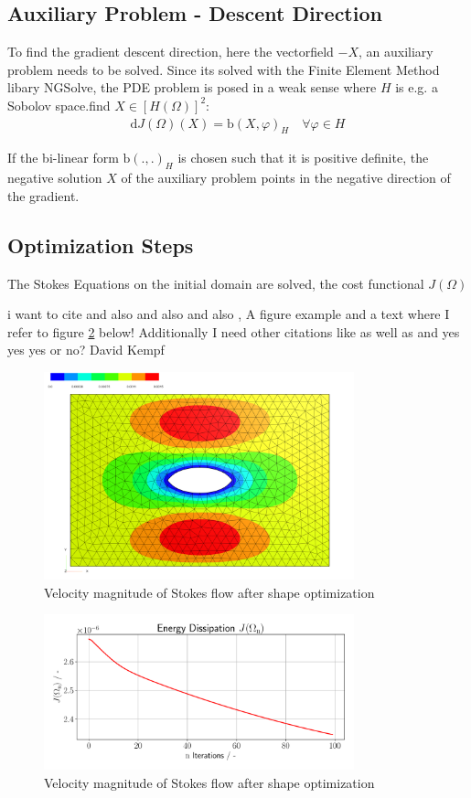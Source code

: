 \subsection*{Auxiliary Problem - Descent Direction}
To find the gradient descent direction, here the vectorfield $-X$, an auxiliary problem needs to be solved.
Since its solved with the Finite Element Method libary NGSolve, the PDE problem is posed in a weak sense where 
$H$ is e.g. a Sobolov space.find $X \in [H(\Omega)]^2:$ 
\begin{align*}
    \mathrm{d}J(\Omega)(X) = \mathrm{b}(X,\varphi)_H \quad \forall  \varphi \in H
\end{align*}

If the bi-linear form $\mathrm{b}(.,.)_H$ is chosen such that it is positive definite, the negative solution $X$
of the auxiliary problem points in the negative direction of the gradient.

\pagebreak

\subsection*{Optimization Steps}
The Stokes Equations on the initial domain are solved, the cost functional $J(\Omega)$



i want to cite \cite{fully_semi_paper_sturm}
and also \cite{vol_bary_constraint_paper} and also \cite{lecture_notes_sturm} and also \cite{nearly_conformal_paper}, 
A figure example and a text where I refer to figure \ref{shape_opt_plot} below! Additionally I need other citations like \cite{lecture_notes_faustmann_numPDE}
as well as \cite{lecture_notes_faustmann_AMF} and \cite{lecture_notes_melenk_numcomp}
yes yes yes or no? David Kempf
\begin{figure}[ht]
    \centering
    \includegraphics[width=0.8\textwidth]{figures/solution_shape_opt.PNG}
	\caption{Velocity magnitude of Stokes flow after shape optimization}
	\label{shape_opt_plot}
\end{figure}

\begin{figure}[ht]
    \centering
    \includegraphics[width=0.8\textwidth]{figures/energy_diss_plot.pdf}
	\caption{Velocity magnitude of Stokes flow after shape optimization}
	\label{shape_opt_plot}
\end{figure}